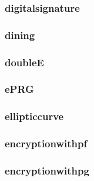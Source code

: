 \begin{frame}\frametitle{digitalsignature}
\begin{figure}
\begin{center}

\end{center}
\end{figure}
\end{frame}
\begin{frame}\frametitle{dining}
\begin{figure}
\begin{center}

\end{center}
\end{figure}
\end{frame}
\begin{frame}\frametitle{doubleE}
\begin{figure}
\begin{center}

\end{center}
\end{figure}
\end{frame}
\begin{frame}\frametitle{ePRG}
\begin{figure}
\begin{center}

\end{center}
\end{figure}
\end{frame}
\begin{frame}\frametitle{ellipticcurve}
\begin{figure}
\begin{center}

\end{center}
\end{figure}
\end{frame}
\begin{frame}\frametitle{encryptionwithpf}
\begin{figure}
\begin{center}

\end{center}
\end{figure}
\end{frame}
\begin{frame}\frametitle{encryptionwithpg}
\begin{figure}
\begin{center}

\end{center}
\end{figure}
\end{frame}
